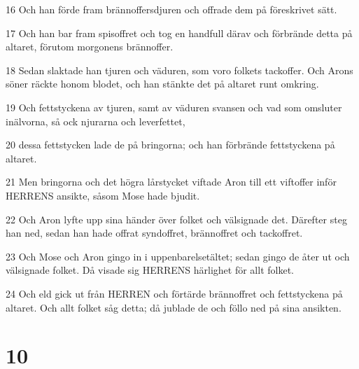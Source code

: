 \par 16 Och han förde fram brännoffersdjuren och offrade dem på föreskrivet sätt.
\par 17 Och han bar fram spisoffret och tog en handfull därav och förbrände detta på altaret, förutom morgonens brännoffer.
\par 18 Sedan slaktade han tjuren och väduren, som voro folkets tackoffer. Och Arons söner räckte honom blodet, och han stänkte det på altaret runt omkring.
\par 19 Och fettstyckena av tjuren, samt av väduren svansen och vad som omsluter inälvorna, så ock njurarna och leverfettet,
\par 20 dessa fettstycken lade de på bringorna; och han förbrände fettstyckena på altaret.
\par 21 Men bringorna och det högra lårstycket viftade Aron till ett viftoffer inför HERRENS ansikte, såsom Mose hade bjudit.
\par 22 Och Aron lyfte upp sina händer över folket och välsignade det. Därefter steg han ned, sedan han hade offrat syndoffret, brännoffret och tackoffret.
\par 23 Och Mose och Aron gingo in i uppenbarelsetältet; sedan gingo de åter ut och välsignade folket. Då visade sig HERRENS härlighet för allt folket.
\par 24 Och eld gick ut från HERREN och förtärde brännoffret och fettstyckena på altaret. Och allt folket såg detta; då jublade de och föllo ned på sina ansikten.

\chapter{10}

